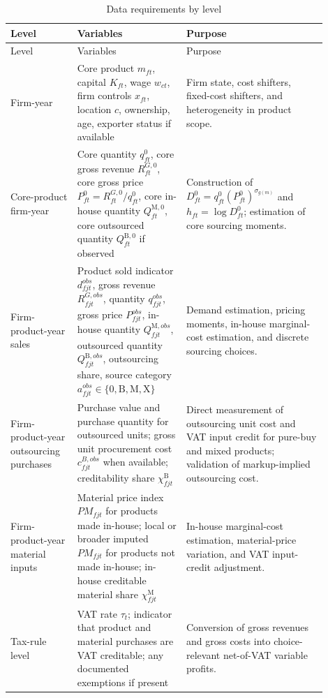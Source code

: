\documentclass[11pt,a4paper]{article}
\newcommand{\M}{\mathrm{M}}
\newcommand{\B}{\mathrm{B}}
\newcommand{\X}{\mathrm{X}}
\begin{document}
\begin{longtable}{L{0.19\linewidth}L{0.31\linewidth}L{0.40\linewidth}}
\caption{Data requirements by level}\label{tab:data_requirements}\\
\toprule
Level & Variables & Purpose \\
\midrule
\endfirsthead
\toprule
Level & Variables & Purpose \\
\midrule
\endhead
Firm-year & Core product $m_{ft}$, capital $K_{ft}$, wage $w_{ct}$, firm controls $x_{ft}$, location $c$, ownership, age, exporter status if available & Firm state, cost shifters, fixed-cost shifters, and heterogeneity in product scope. \\
\addlinespace
Core-product firm-year & Core quantity $q^0_{ft}$, core gross revenue $R^{G,0}_{ft}$, core gross price $P^0_{ft}=R^{G,0}_{ft}/q^0_{ft}$, core in-house quantity $Q^{\M,0}_{ft}$, core outsourced quantity $Q^{\B,0}_{ft}$ if observed & Construction of $D^0_{ft}=q^0_{ft}(P^0_{ft})^{\sigma_{g(m)}}$ and $h_{ft}=\log D^0_{ft}$; estimation of core sourcing moments. \\
\addlinespace
Firm-product-year sales & Product sold indicator $d^{obs}_{fjt}$, gross revenue $R^{G,obs}_{fjt}$, quantity $q^{obs}_{fjt}$, gross price $P^{obs}_{fjt}$, in-house quantity $Q^{\M,obs}_{fjt}$, outsourced quantity $Q^{\B,obs}_{fjt}$, outsourcing share, source category $a^{obs}_{fjt}\in\{0,\B,\M,\X\}$ & Demand estimation, pricing moments, in-house marginal-cost estimation, and discrete sourcing choices. \\
\addlinespace
Firm-product-year outsourcing purchases & Purchase value and purchase quantity for outsourced units; gross unit procurement cost $c^{B,obs}_{fjt}$ when available; creditability share $\chi^{\B}_{fjt}$ & Direct measurement of outsourcing unit cost and VAT input credit for pure-buy and mixed products; validation of markup-implied outsourcing cost. \\
\addlinespace
Firm-product-year material inputs & Material price index $PM_{fjt}$ for products made in-house; local or broader imputed $PM_{fjt}$ for products not made in-house; in-house creditable material share $\chi^{\M}_{fjt}$ & In-house marginal-cost estimation, material-price variation, and VAT input-credit adjustment. \\
\addlinespace
Tax-rule level & VAT rate $\tau_t$; indicator that product and material purchases are VAT creditable; any documented exemptions if present & Conversion of gross revenues and gross costs into choice-relevant net-of-VAT variable profits. \\

\end{longtable}
\end{document}
